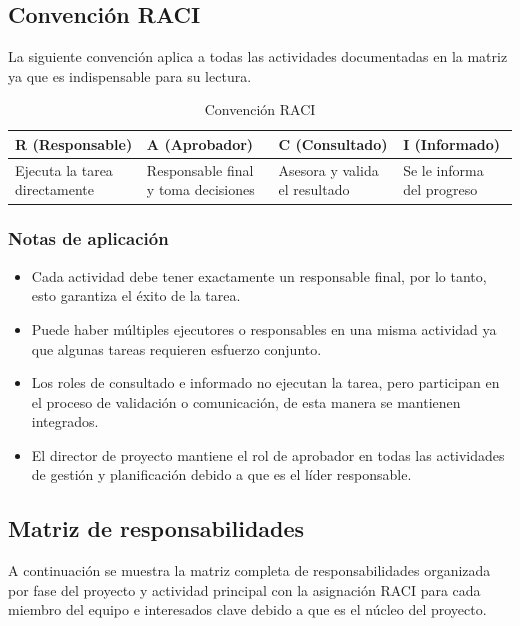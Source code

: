 \documentclass[11pt,spanish]{article}
\begin{document}
\subsection{Convención RACI}

La siguiente convención aplica a todas las actividades documentadas en la matriz ya que es indispensable para su lectura.

\begin{table}[H]
\centering
\caption{Convención RACI}
\label{tab:convencion-raci}
{\small
\setlength{\tabcolsep}{4pt}
\begin{tabularx}{\textwidth}{Y Y Y Y}
\toprule
\textbf{R (Responsable)} & \textbf{A (Aprobador)} & \textbf{C (Consultado)} & \textbf{I (Informado)} \\
\midrule
Ejecuta la tarea directamente & Responsable final y toma decisiones & Asesora y valida el resultado & Se le informa del progreso \\
\bottomrule
\end{tabularx}
}
\end{table}

\subsubsection{Notas de aplicación}

\begin{itemize}
    \item Cada actividad debe tener exactamente un responsable final, por lo tanto, esto garantiza el éxito de la tarea.
    \item Puede haber múltiples ejecutores o responsables en una misma actividad ya que algunas tareas requieren esfuerzo conjunto.
    \item Los roles de consultado e informado no ejecutan la tarea, pero participan en el proceso de validación o comunicación, de esta manera se mantienen integrados.
    \item El director de proyecto mantiene el rol de aprobador en todas las actividades de gestión y planificación debido a que es el líder responsable.
\end{itemize}

\subsection{Matriz de responsabilidades}

A continuación se muestra la matriz completa de responsabilidades organizada por fase del proyecto y actividad principal con la asignación RACI para cada miembro del equipo e interesados clave debido a que es el núcleo del proyecto.
\end{document}
